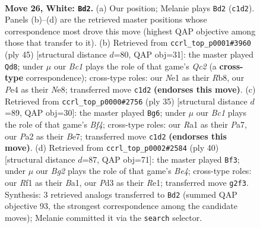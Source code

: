 \documentclass[11pt]{article}
\begin{document}
\clearpage

\begin{figure}[p]\centering
\begin{subfigure}{0.46\textwidth}\centering
\resizebox{\linewidth}{!}{%
\newchessgame
\chessboard[
  setfen={nrbr2k1/5pb1/p6p/2p1p2q/1p2P2n/3P4/PPQ2PB1/RNB1NRK1 w - - 0 26},
  showmover=false,
  pgfstyle=straightmove, color=movearrow, markmove={c1-d2}
]}
\caption{}
\end{subfigure}\hfill
\begin{subfigure}{0.46\textwidth}\centering
\resizebox{\linewidth}{!}{%
\newchessgame
\chessboard[
  setfen={1r2n1k1/2qrbpp1/2bpp2p/1p6/1P1BPP2/2NR1BQP/2P3P1/4R2K b - - 0 23},
  showmover=false,
  pgfstyle=straightmove, color=movearrow, markmove={c7-d8}
]}
\caption{}
\end{subfigure}
\\[4pt]
\begin{subfigure}{0.46\textwidth}\centering
\resizebox{\linewidth}{!}{%
\newchessgame
\chessboard[
  setfen={4rr1k/p1q1b1pp/2pp1n2/4pb2/2P5/1P3N1P/P4PP1/R1BQRBK1 b - - 2 18},
  showmover=false,
  pgfstyle=straightmove, color=movearrow, markmove={f5-g6}
]}
\caption{}
\end{subfigure}\hfill
\begin{subfigure}{0.46\textwidth}\centering
\resizebox{\linewidth}{!}{%
\newchessgame
\chessboard[
  setfen={2br2k1/2q1bp1p/pr3np1/8/2p1BP2/2N3Q1/P1P3PP/B3RR1K w - - 4 21},
  showmover=false,
  pgfstyle=straightmove, color=movearrow, markmove={e4-f3}
]}
\caption{}
\end{subfigure}
\caption{\textbf{Move 26, White: \texttt{Bd2}.} (a) Our position; Melanie plays \texttt{Bd2} (\texttt{c1d2}). Panels (b)--(d) are the retrieved master positions whose correspondence most drove this move (highest QAP objective among those that transfer to it). (b) Retrieved from \texttt{ccrl\_top\_p0001\#3960} (ply 45) [structural distance $d$=80, QAP obj=31]: the master played \texttt{Qd8}; under $\mu$ our \emph{Bc1} plays the role of that game's \emph{Qc2} (a \textbf{cross-type} correspondence); cross-type roles: our \emph{N}e1 as their \emph{R}b8, our \emph{P}e4 as their \emph{N}e8; transferred move \texttt{c1d2} \textbf{(endorses this move)}. (c) Retrieved from \texttt{ccrl\_top\_p0000\#2756} (ply 35) [structural distance $d$=89, QAP obj=30]: the master played \texttt{Bg6}; under $\mu$ our \emph{Bc1} plays the role of that game's \emph{Bf4}; cross-type roles: our \emph{R}a1 as their \emph{P}a7, our \emph{P}a2 as their \emph{B}e7; transferred move \texttt{c1d2} \textbf{(endorses this move)}. (d) Retrieved from \texttt{ccrl\_top\_p0002\#2584} (ply 40) [structural distance $d$=87, QAP obj=71]: the master played \texttt{Bf3}; under $\mu$ our \emph{Bg2} plays the role of that game's \emph{Be4}; cross-type roles: our \emph{R}f1 as their \emph{B}a1, our \emph{P}d3 as their \emph{R}e1; transferred move \texttt{g2f3}. Synthesis: 3 retrieved analogs transferred to \texttt{Bd2} (summed QAP objective 93, the strongest correspondence among the candidate moves); Melanie committed it via the \texttt{search} selector.}
\label{fig:thought-m50}
\end{figure}
\end{document}
